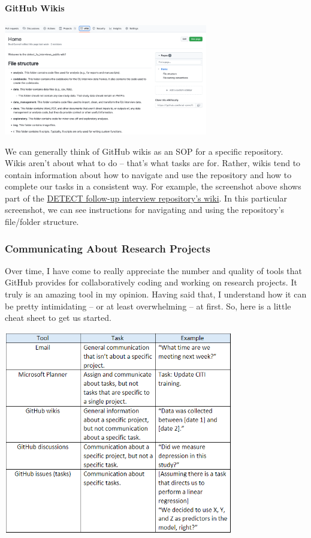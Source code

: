 \documentclass[
  letterpaper,
  DIV=11,
  numbers=noendperiod]{scrreprt}
\let\oldparagraph\paragraph
\renewcommand{\paragraph}[1]{\oldparagraph{#1}\mbox{}}
\begin{document}
\paragraph{GitHub Wikis}\label{github-wikis}

\begin{center}
\includegraphics[width=3.5in,height=\textheight]{chapters/gra_tasks/../../graphics/wikis.png}
\end{center}

We can generally think of GitHub wikis as an SOP for a specific
repository. Wikis aren't about what to do -- that's what tasks are for.
Rather, wikis tend to contain information about how to navigate and use
the repository and how to complete our tasks in a consistent way. For
example, the screenshot above shows part of the
\href{https://github.com/brad-cannell/detect_fu_interviews_public/wiki}{DETECT
follow-up interview repository's wiki}. In this particular screenshot,
we can see instructions for navigating and using the repository's
file/folder structure.

\subsubsection{Communicating About Research
Projects}\label{communicating-about-research-projects}

Over time, I have come to really appreciate the number and quality of
tools that GitHub provides for collaboratively coding and working on
research projects. It truly is an amazing tool in my opinion. Having
said that, I understand how it can be pretty intimidating -- or at least
overwhelming -- at first. So, here is a little cheat sheet to get us
started.

\begin{center}
\includegraphics[width=0.75\textwidth,height=\textheight]{chapters/gra_tasks/../../graphics/cheat_sheet.png}
\end{center}
\end{document}
